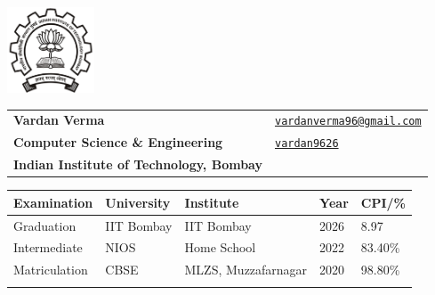 \documentclass[11pt,letterpaper,sans]{moderncv}
\newif\iflong
\newcommand{\makefield}[2]{\makebox[1.5em]{\color{black}#1} #2\hspace{2em}}
\begin{document}
\iflong
  \addtolength{\topmargin}{5.54mm}
\fi
\vspace*{-8pt}

\setlength{\arrayrulewidth}{0.5mm}
\begin{minipage}{0.15\linewidth}
    \centering
    \includegraphics[height=1.0in]{iitb.png}
\end{minipage}
\begin{minipage}{0.65\linewidth}
    \setlength{\tabcolsep}{18pt}
    \def\arraystretch{1.15}
    \begin{tabular}{ll}
        \textbf{\Large{Vardan Verma}} & \makefield{\faEnvelope}{\href{mailto:vardanverma96@gmail.com}{\texttt{vardanverma96@gmail.com}}} \\
        \textbf{Computer Science \& Engineering} & \makefield{\faGithub}{\href{https://github.com/vardan9626}{\texttt{vardan9626}}}\\ 
        \textbf{Indian Institute of Technology, Bombay}\\
    \end{tabular}
\end{minipage}\hfill

\vspace{-7pt}
\setlength{\tabcolsep}{23pt}
\begin{center}
  \begin{tabular}{lllll}
  \toprule
  \textbf{Examination} & \textbf{University} & \textbf{Institute} & \textbf{Year} & \textbf{CPI/\%} \\ 
  \toprule
  Graduation  & IIT Bombay & IIT Bombay  & 2026   & 8.97\\ 
  Intermediate & NIOS  & Home School & 2022 & 83.40\% \\ 
  Matriculation & CBSE & MLZS, Muzzafarnagar & 2020 & 98.80\% \\ 
  \bottomrule \\[-0.75cm]
  \end{tabular}
\end{center}
\setlength{\tabcolsep}{0pt}

\vspace*{-1em}
\end{document}
